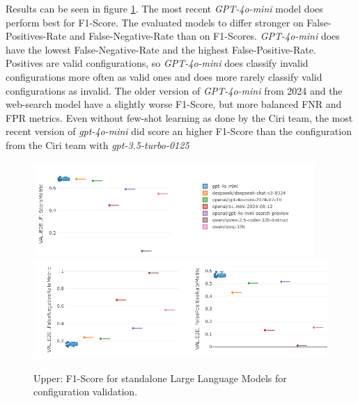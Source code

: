 Results can be seen in figure \ref{fig:LLMStandalone-Results}. The most recent \textit{GPT-4o-mini} model does perform best for F1-Score. The evaluated models to differ stronger on False-Positives-Rate and False-Negative-Rate than on F1-Scores. \textit{GPT-4o-mini} does have the lowest False-Negative-Rate and the highest False-Positive-Rate. Positives are valid configurations, so \textit{GPT-4o-mini} does classify invalid configurations more often as valid ones and does more rarely classify valid configurations as invalid. The older version of \textit{GPT-4o-mini} from 2024 and the web-search model have a slightly worse F1-Score, but more balanced FNR and FPR metrics. Even without few-shot learning as done by the Ciri team, the most recent version of \textit{gpt-4o-mini} did score an higher F1-Score than the configuration from the Ciri team with \textit{gpt-3.5-turbo-0125}


\begin{figure}[h]
    \centering
    \includegraphics[width=0.95\textwidth]{images/LLMStandalone-by-model.png}\\[6pt]
    \includegraphics[width=\textwidth]{images/LLMStandalone-by-model-FNRFPR.png}
    \caption{Upper: F1-Score for standalone Large Language Models for configuration validation. }
    \label{fig:LLMStandalone-Results}
  \end{figure}

